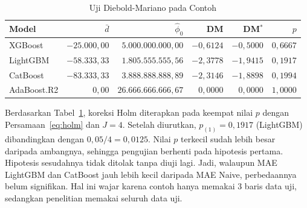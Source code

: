 \begin{table}[htbp]
  \caption{Uji Diebold-Mariano pada Contoh}
  \label{tab:man-dm}
  \centering
  \begingroup
  \footnotesize
  \setlength{\tabcolsep}{4pt}
  \begin{tabular}{|l|r|r|r|r|r|}
    \hline
    \textbf{Model} & \textbf{$\bar{d}$} & \textbf{$\hat{\phi}_0$} & \textbf{DM} & \textbf{DM$^{*}$} & \textbf{$p$} \\
    \hline
    XGBoost & $-25.000{,}00$ & $5.000.000.000{,}00$ & $-0{,}6124$ & $-0{,}5000$ & $0{,}6667$ \\
    LightGBM & $-58.333{,}33$ & $1.805.555.555{,}56$ & $-2{,}3778$ & $-1{,}9415$ & $0{,}1917$ \\
    CatBoost & $-83.333{,}33$ & $3.888.888.888{,}89$ & $-2{,}3146$ & $-1{,}8898$ & $0{,}1994$ \\
    AdaBoost.R2 & $0{,}00$ & $26.666.666.666{,}67$ & $0{,}0000$ & $0{,}0000$ & $1{,}0000$ \\
    \hline
  \end{tabular}
  \endgroup
\end{table}

Berdasarkan Tabel~\ref{tab:man-dm}, koreksi Holm diterapkan pada keempat nilai
$p$ dengan Persamaan~\eqref{eq:holm} dan $J = 4$. Setelah diurutkan,
$p_{(1)} = 0{,}1917$ (LightGBM) dibandingkan dengan $0{,}05/4 = 0{,}0125$.
Nilai $p$ terkecil sudah lebih besar daripada ambangnya, sehingga pengujian
berhenti pada hipotesis pertama. Hipotesis sesudahnya tidak ditolak tanpa
diuji lagi. Jadi, walaupun MAE LightGBM dan CatBoost jauh lebih kecil daripada
MAE Naive, perbedaannya belum signifikan. Hal ini wajar karena contoh hanya
memakai 3 baris data uji, sedangkan penelitian memakai seluruh data uji.
